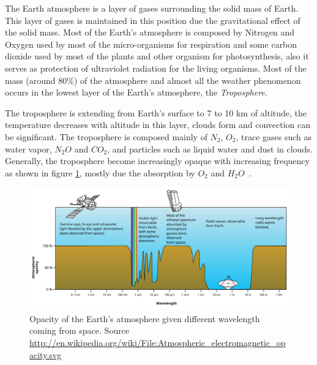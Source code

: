 The Earth atmosphere is a layer of gases surrounding the solid mass of Earth. This layer of gases is maintained in this position due the gravitational effect of the solid mass. Most of the Earth's atmosphere is composed by Nitrogen and Oxygen used by most of the micro-organisms for respiration and some carbon dioxide used by most of the plants and other organism for photosynthesis,	also it serves as protection of ultraviolet radiation for the living organisms. Most of the mass (around $80\%$) of the atmosphere and almost all the weather phenomenon occurs in the lowest layer of the Earth's atmosphere, the \textit{Troposphere}.

The troposphere is extending from Earth's surface to 7 to 10 km of altitude, the temperature decreases with altitude in this layer, clouds form and convection can be significant. The troposphere is composed mainly of $N_2$, $O_2$, trace gases such as water vapor, $N_2O$ and $CO_2$, and particles such as liquid water and dust in clouds. Generally, the troposphere become increasingly opaque with increasing frequency as shown in figure \ref{fig:atmospheric-opacity}, mostly due the absorption by $O_2$ and $H_2O$~\cite{taylor99}.

\begin{figure}[htbp]
\includegraphics[width=\textwidth]{images/Atmospheric_electromagnetic_opacity}
\caption[Opacity of the Earth's atmosphere given different wavelength coming from space]{Opacity of the Earth's atmosphere given different wavelength coming from space. Source \url{http://en.wikipedia.org/wiki/File:Atmospheric_electromagnetic_opacity.svg}}
\label{fig:atmospheric-opacity}
\end{figure}

